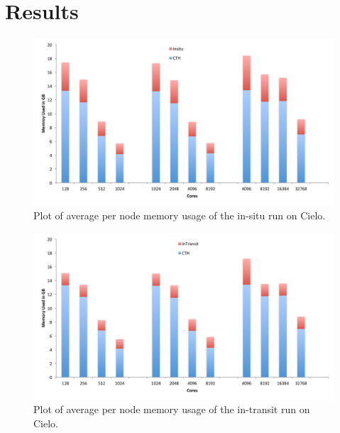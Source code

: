 \section{Results}
\label{sec:Results}


\begin{figure}[htb]
  \centering
  \includegraphics[width=\linewidth]{figures/MemoryUsageInSituPerNode.pdf}
  \caption{Plot of average per node memory usage of the in-situ run on Cielo.}
  \label{fig:MemoryInSituPerNode}
\end{figure}

\begin{figure}[htb]
  \centering
  \includegraphics[width=\linewidth]{figures/MemoryUsageInTransitPerNode.pdf}
  \caption{Plot of average per node memory usage of the in-transit run on Cielo.}
  \label{fig:MemoryInTransitPerNode}
\end{figure}

